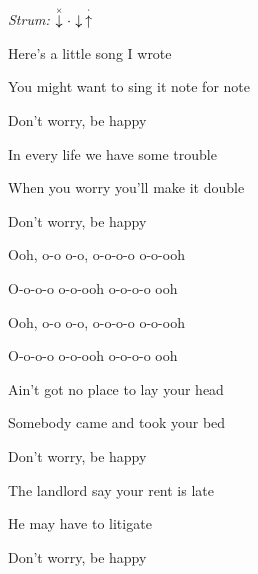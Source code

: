 \begin{song}


\begin{headerbox}
\RaiseBoxWithChucks
{} \quad
\textit{Strum:} $\ChuckDown\Miss\Down\StaccatoUp$ 
\end{headerbox}


\begin{hchordbox}
\end{hchordbox}

\bigskip

\Large

 Here's a little song I wrote \par
You might want to sing it note for note \par
Don't worry, be happy \par

\bigskip

 In every life we have some trouble \par
{} When you worry you'll make it double \par
Don't worry, be happy  \par

\bigskip

\begin{chorusboxwide}{\Chorus}
Ooh, o-o o-o, o-o-o-o o-o-ooh  \par
O-o-o-o o-o-ooh  o-o-o-o ooh  \par
{}Ooh, o-o o-o, o-o-o-o o-o-ooh  \par
O-o-o-o o-o-ooh  o-o-o-o ooh  \par
\end{chorusboxwide}

\bigskip

 Ain't got no place to lay your head \par
{} Somebody came and took your bed \par
Don't worry, be happy \par

\bigskip

The landlord say your rent is late \par
{} He may have to litigate \par
Don't worry, be happy \par


\end{song}
